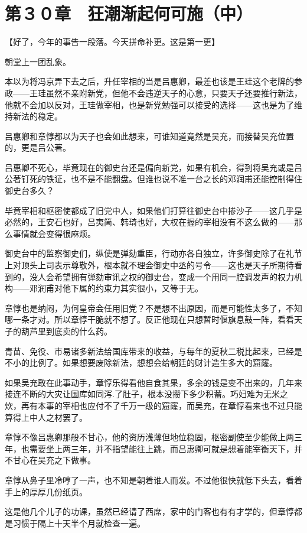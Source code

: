 \section{第３０章　狂潮渐起何可施（中）}

【好了，今年的事告一段落。今天拼命补更。这是第一更】

朝堂上一团乱象。

本以为将冯京弄下去之后，升任宰相的当是吕惠卿，最差也该是王珪这个老牌的参政——王珪虽然不亲附新党，但他不会违逆天子的心意，只要天子还要推行新法，他就不会加以反对，王珪做宰相，也是新党勉强可以接受的选择——这也是为了维持新法的稳定。

吕惠卿和章惇都以为天子也会如此想来，可谁知道竟然是吴充，而接替吴充位置的，更是吕公著。

吕惠卿不死心，毕竟现在的御史台还是偏向新党，如果有机会，得到将吴充或是吕公著钉死的铁证，也不是不能翻盘。但谁也说不准一台之长的邓润甫还能控制得住御史台多久？

毕竟宰相和枢密使都成了旧党中人，如果他们打算往御史台中掺沙子——这几乎是必然的，王安石也好，吕夷简、韩琦也好，大权在握的宰相没有不这么做的——那么事情就会变得很麻烦。

御史台中的监察御史们，纵使是弹劾重臣，行动亦各自独立，许多御史除了在礼节上对顶头上司表示尊敬外，根本就不理会御史中丞的号令——这也是天子所期待看到的，没人会希望拥有弹劾审讯之权的御史台，变成一个用同一腔调发声的权力机构——邓润甫对他下属的约束力其实很小，又等于无。

章惇也是纳闷，为何皇帝会任用旧党？不是想不出原因，而是可能性太多了，不知哪一条才对。所以章惇干脆就不想了。反正他现在只想暂时偃旗息鼓一阵，看看天子的葫芦里到底卖的什么药。

青苗、免役、市易诸多新法给国库带来的收益，与每年的夏秋二税比起来，已经是不小的比例了。如果想要废除新法，想想会给朝廷的财计造生多大的窟窿。

如果吴充敢在此事动手，章惇乐得看他自食其果，多余的钱是变不出来的，几年来接连不断的大灾让国库如同泻.了肚子，根本没攒下多少积蓄。巧妇难为无米之炊，再有本事的宰相也应付不了千万一级的窟窿，而吴充，在章惇看来也不过只能算得上中人之材罢了。

章惇不像吕惠卿那般不甘心，他的资历浅薄但地位稳固，枢密副使至少能做上两三年，也需要坐上两三年，并不指望能往上跳，而吕惠卿可就是想着能宰衡天下，并不甘心在吴充之下做事。

章惇从鼻子里冷哼了一声，也不知是朝着谁人而发。不过他很快就低下头去，看着手上的厚厚几份纸页。

这是他几个儿子的功课，虽然已经请了西席，家中的门客也有有才学的，但章惇都是习惯于隔上十天半个月就检查一遍。


